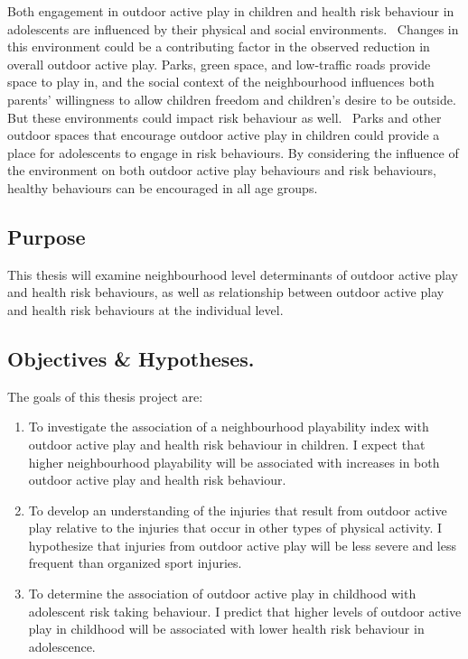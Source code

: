 \documentclass [11pt]{article}
\begin{document}
Both engagement in outdoor active play in children and health risk behaviour in adolescents are influenced by their physical and social environments.~\cite{Aarts2010-pk} Changes in this environment could be a contributing factor in the observed reduction in overall outdoor active play. Parks, green space, and low-traffic roads provide space to play in, and the social context of the neighbourhood influences both parents' willingness to allow children freedom and children's desire to be outside. But these environments could impact risk behaviour as well.~\cite{Wallace2017-kj,Spilkova2014-iv} Parks and other outdoor spaces that encourage outdoor active play in children could provide a place for adolescents to engage in risk behaviours. By considering the influence of the environment on both outdoor active play behaviours and risk behaviours, healthy behaviours can be encouraged in all age groups.

\subsection{Purpose}

This thesis will examine neighbourhood level determinants of outdoor active play and health risk behaviours, as well as relationship between outdoor active play and health risk behaviours at the individual level.  

\subsection{Objectives \& Hypotheses.} The goals of this thesis project are:
\begin{enumerate}
\item To investigate the association of a neighbourhood playability index with outdoor active play and health risk behaviour in children. I expect that higher neighbourhood playability will be associated with increases in both outdoor active play and health risk behaviour. 
\item To develop an understanding of the injuries that result from outdoor active play relative to the injuries that occur in other types of physical activity. I hypothesize that injuries from outdoor active play will be less severe and less frequent than organized sport injuries.
\item To determine the association of outdoor active play in childhood with adolescent risk taking behaviour. I predict that higher levels of outdoor active play in childhood will be associated with lower health risk behaviour in adolescence.
\end{enumerate}
\end{document}
